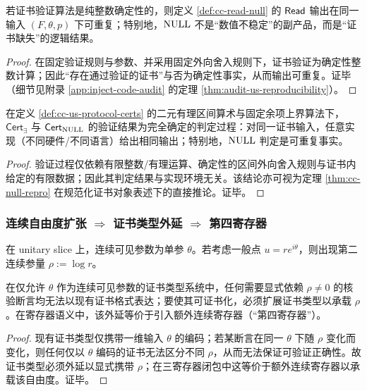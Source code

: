 \begin{theorem}\label{thm:cc-null-repro}
若证书验证算法是纯整数确定性的，则定义 \ref{def:cc-read-null} 的 $\mathsf{Read}$ 输出在同一输入 $(F,\theta,p)$ 下可重复；特别地，$\mathrm{NULL}$ 不是“数值不稳定”的副产品，而是“证书缺失”的逻辑结果。
\end{theorem}

\begin{proof}
在固定验证规则与参数、并采用固定外向舍入规则下，证书验证为确定性整数计算；因此“存在通过验证的证书”与否为确定性事实，从而输出可重复。证毕（细节见附录 \ref{app:inject-code-audit} 的定理 \ref{thm:audit-us-reproducibility}）。
\end{proof}

\begin{theorem}\label{thm:cc-null-repro-protocol}
在定义 \ref{def:cc-us-protocol-certs} 的二元有理区间算术与固定余项上界算法下，$\mathsf{Cert}_\exists$ 与 $\mathsf{Cert}_{\mathrm{NULL}}$ 的验证结果为完全确定的判定过程：对同一证书输入，任意实现（不同硬件/不同语言）给出相同输出；特别地，$\mathrm{NULL}$ 判定是可重复事实。
\end{theorem}

\begin{proof}
验证过程仅依赖有限整数/有理运算、确定性的区间外向舍入规则与证书内给定的有限数据；因此其判定结果与实现环境无关。该结论亦可视为定理 \ref{thm:cc-null-repro} 在规范化证书对象表述下的直接推论。证毕。
\end{proof}

\subsubsection{连续自由度扩张 \texorpdfstring{$\Rightarrow$}{=>} 证书类型外延 \texorpdfstring{$\Rightarrow$}{=>} 第四寄存器}\label{subsubsec:cc-fourth}
\begin{theorem}[连续自由度扩张的证书外延]\label{thm:cc-fourth-register-certs}
在 unitary slice 上，连续可见参数为单参 $\theta$。若考虑一般点 $u=re^{i\theta}$，则出现第二连续参量 $\rho:=\log r$。\par
在仅允许 $\theta$ 作为连续可见参数的证书类型系统中，任何需要显式依赖 $\rho\neq 0$ 的核验断言均无法以现有证书格式表达；要使其可证书化，必须扩展证书类型以承载 $\rho$。在寄存器语义中，该外延等价于引入额外连续寄存器（“第四寄存器”）。
\end{theorem}

\begin{proof}
现有证书类型仅携带一维输入 $\theta$ 的编码；若某断言在同一 $\theta$ 下随 $\rho$ 变化而变化，则任何仅以 $\theta$ 编码的证书无法区分不同 $\rho$，从而无法保证可验证正确性。故证书类型必须外延以显式携带 $\rho$；在三寄存器闭包中这等价于额外连续寄存器以承载该自由度。证毕。
\end{proof}

